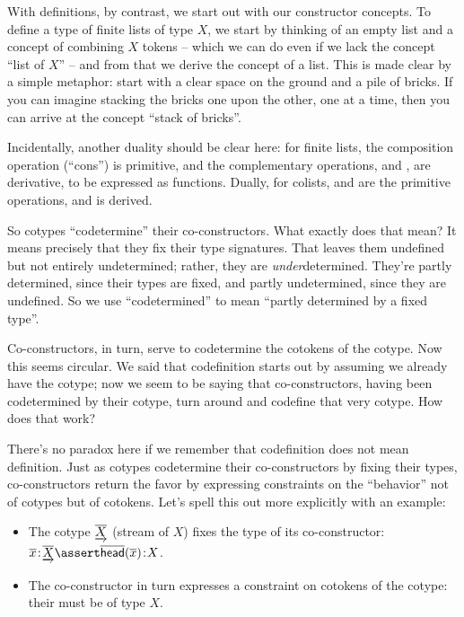 \documentclass{article}
\begin{document}
With definitions, by contrast, we start out with our constructor
concepts. To define a type of finite lists of type \(X\), we start by
thinking of an empty list and a concept of combining \(X\) tokens --
which we can do even if we lack the concept ``list of \(X\)'' -- and
from that we derive the concept of a list. This is made clear by a
simple metaphor: start with a clear space on the ground and a pile of
bricks. If you can imagine stacking the bricks one upon the other, one
at a time, then you can arrive at the concept ``stack of bricks''.

Incidentally, another duality should be clear here: for finite lists,
the composition operation (``cons'') is primitive, and the
complementary operations, \head{} and \tail{}, are derivative, to be
expressed as functions. Dually, for colists, \cohead{} and \cotail{}
are the primitive operations, and \cocons{} is derived.

So cotypes ``codetermine'' their co-constructors. What exactly does
that mean? It means precisely that they fix their type signatures.
That leaves them undefined but not entirely undetermined; rather, they
are \textit{under}determined. They're partly determined, since their
types are fixed, and partly undetermined, since they are undefined. So
we use ``codetermined'' to mean ``partly determined by a fixed
type''.

Co-constructors, in turn, serve to codetermine the cotokens of the
cotype. Now this seems circular. We said that codefinition starts out
by assuming we already have the cotype; now we seem to be saying that
co-constructors, having been codetermined by their cotype, turn around
and codefine that very cotype. How does that work?

There's no paradox here if we remember that codefinition does not mean
definition. Just as cotypes codetermine their co-constructors by
fixing their types, co-constructors return the favor by expressing
constraints on the ``behavior'' not of cotypes but of cotokens. Let's spell this out more explicitly with an example:

\begin{itemize}
\item The cotype \(\underrightarrow{\overline{X}}\) (stream of \(X\)) fixes the type of
  its \cohead{} co-constructor:
  \(\tj{\cotok{x}}{\colist{X}}\linfer\tj{\cohead(\cotok{x})}{X}\).
  \item The co-constructor in turn expresses a constraint on cotokens
    of the cotype: their \cohead{} must be of type \(X\).
\end{itemize}
\end{document}
